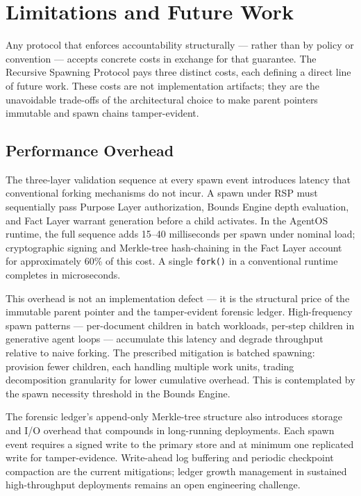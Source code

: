 \section{Limitations and Future Work}
\label{sec:rs-limitations}

Any protocol that enforces accountability structurally — rather than by policy or convention — accepts concrete costs in exchange for that guarantee. The Recursive Spawning Protocol pays three distinct costs, each defining a direct line of future work. These costs are not implementation artifacts; they are the unavoidable trade-offs of the architectural choice to make parent pointers immutable and spawn chains tamper-evident.

\subsection{Performance Overhead}
\label{sec:rs-perf-overhead}

The three-layer validation sequence at every spawn event introduces latency that conventional forking mechanisms do not incur. A spawn under RSP must sequentially pass Purpose Layer authorization, Bounds Engine depth evaluation, and Fact Layer warrant generation before a child activates. In the AgentOS runtime, the full sequence adds \numrange{15}{40} milliseconds per spawn under nominal load; cryptographic signing and Merkle-tree hash-chaining in the Fact Layer account for approximately 60\% of this cost. A single \texttt{fork()} in a conventional runtime completes in microseconds.

This overhead is not an implementation defect — it is the structural price of the immutable parent pointer and the tamper-evident forensic ledger. High-frequency spawn patterns — per-document children in batch workloads, per-step children in generative agent loops — accumulate this latency and degrade throughput relative to naive forking. The prescribed mitigation is batched spawning: provision fewer children, each handling multiple work units, trading decomposition granularity for lower cumulative overhead. This is contemplated by the spawn necessity threshold in the Bounds Engine.

The forensic ledger's append-only Merkle-tree structure also introduces storage and I/O overhead that compounds in long-running deployments. Each spawn event requires a signed write to the primary store and at minimum one replicated write for tamper-evidence. Write-ahead log buffering and periodic checkpoint compaction are the current mitigations; ledger growth management in sustained high-throughput deployments remains an open engineering challenge.

